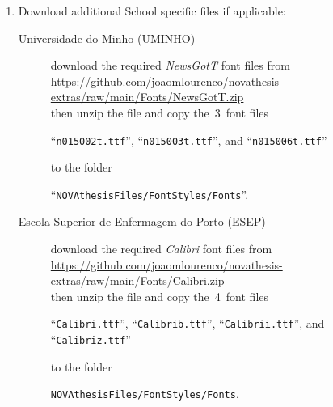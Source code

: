 \begin{enumerate}
  \item \label{it:project_available} Download additional School specific files if applicable:
  \begin{description}
    \item[Universidade do Minho (UMINHO)] download the required \emph{NewsGotT} font files from
    \url{https://github.com/joaomlourenco/novathesis-extras/raw/main/Fonts/NewsGotT.zip}\\
    then unzip the file and copy the~3~font files
\begin{flushleft}
\hspace*{0.5cm}“\verb!n015002t.ttf!”, “\verb!n015003t.ttf!”, and “\verb!n015006t.ttf!”
\end{flushleft}
    to the folder
\begin{flushleft}
\hspace*{0.5cm}“\verb!NOVAthesisFiles/FontStyles/Fonts!”.
\end{flushleft}
    \item[Escola Superior de Enfermagem do Porto (ESEP)] download the required \emph{Calibri} font files from
    \url{https://github.com/joaomlourenco/novathesis-extras/raw/main/Fonts/Calibri.zip}\\
    then unzip the file and copy the~4~font files
\begin{flushleft}
\hspace*{0.5cm}“\verb!Calibri.ttf!”, “\verb!Calibrib.ttf!”, “\verb!Calibrii.ttf!”, and “\verb!Calibriz.ttf!”
\end{flushleft}
      \noindent to the folder
\begin{flushleft}
\hspace*{0.5cm}\verb!NOVAthesisFiles/FontStyles/Fonts!.
\end{flushleft}
  \end{description}


\end{enumerate}
